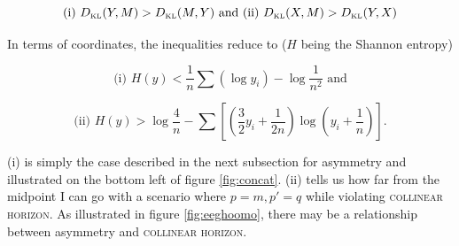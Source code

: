 \documentclass[12pt]{article}
\begin{document}
\begin{equation}
  \label{eq:dailoosu}
  \mbox{(i) }D_{\mbox{\tiny KL}}(Y,M)>D_{\mbox{\tiny KL}}(M,Y)\mbox{ and (ii) }D_{\mbox{\tiny KL}}(X,M)>D_{\mbox{\tiny KL}}(Y,X)
\end{equation}

In terms of coordinates, the inequalities reduce to ($H$ being the
Shannon entropy)

\begin{equation}
  \label{eq:iengaech}
\mbox{(i) }H(y)<\frac{1}{n}\sum\left(\log{}y_{i}\right)-\log\frac{1}{n^{2}}\mbox{ and}
\end{equation}

\begin{equation}
  \label{eq:feovaivo}
\mbox{(ii) }H(y)>\log\frac{4}{n}-\sum\left[\left(\frac{3}{2}y_{i}+\frac{1}{2n}\right)\log\left(y_{i}+\frac{1}{n}\right)\right].
\end{equation}

(i) is simply the case described in the next subsection for asymmetry
and illustrated on the bottom left of figure \ref{fig:concat}. (ii)
tells us how far from the midpoint I can go with a scenario where
$p=m,p'=q$ while violating \textsc{collinear horizon}. As illustrated
in figure \ref{fig:eeghoomo}, there may be a relationship between
asymmetry and \textsc{collinear horizon}.
\end{document}
